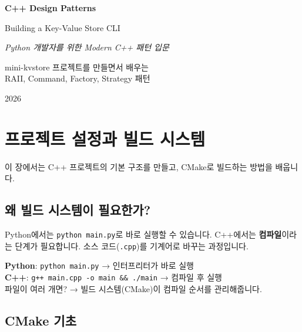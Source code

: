 \documentclass[11pt,a4paper]{book}
\newcommand{\file}[1]{\texttt{#1}}
\newcommand{\code}[1]{\texttt{#1}}
\begin{document}
\begin{titlepage}
\centering
\vspace*{3cm}
{\Huge\bfseries C++ Design Patterns\par}
\vspace{0.5cm}
{\LARGE Building a Key-Value Store CLI\par}
\vspace{1.5cm}
{\Large\itshape Python 개발자를 위한 Modern C++ 패턴 입문\par}
\vspace{3cm}
{\large mini-kvstore 프로젝트를 만들면서 배우는\\
RAII, Command, Factory, Strategy 패턴\par}
\vfill
{\large 2026\par}
\end{titlepage}

\tableofcontents

\chapter{프로젝트 설정과 빌드 시스템}
\label{ch:setup}

이 장에서는 C++ 프로젝트의 기본 구조를 만들고, CMake로 빌드하는 방법을 배웁니다.

\section{왜 빌드 시스템이 필요한가?}

Python에서는 \code{python main.py}로 바로 실행할 수 있습니다. C++에서는 \textbf{컴파일}이라는 단계가 필요합니다. 소스 코드(\file{.cpp})를 기계어로 바꾸는 과정입니다.

\begin{pythonbox}
\textbf{Python}: \code{python main.py} → 인터프리터가 바로 실행\\
\textbf{C++}: \code{g++ main.cpp -o main \&\& ./main} → 컴파일 후 실행\\[6pt]
파일이 여러 개면? → 빌드 시스템(CMake)이 컴파일 순서를 관리해줍니다.
\end{pythonbox}

\section{CMake 기초}
\end{document}
